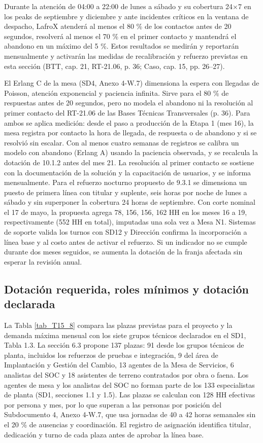 Durante la atención de 04:00 a 22:00 de lunes a sábado y su cobertura 24\ensuremath{\times}7 en los peaks de septiembre y diciembre y ante incidentes críticos en la ventana de despacho, LafroX atenderá al menos el 80 \% de los contactos antes de 20 segundos, resolverá al menos el 70 \% en el primer contacto y mantendrá el abandono en un máximo del 5 \%. Estos resultados se medirán y reportarán mensualmente y activarán las medidas de recalibración y refuerzo previstas en esta sección (BTT, cap. 21, RT-21.06, p. 36; Caso, cap. 15, pp. 26--27).

El Erlang C de la mesa (SD4, Anexo 4-W.7) dimensiona la espera con llegadas de Poisson, atención exponencial y paciencia infinita. Sirve para el 80 \% de respuestas antes de 20 segundos, pero no modela el abandono ni la resolución al primer contacto del RT-21.06 de las Bases Técnicas Transversales (p. 36). Para ambos se aplica medición: desde el paso a producción de la Etapa 1 (mes 16), la mesa registra por contacto la hora de llegada, de respuesta o de abandono y si se resolvió sin escalar. Con al menos cuatro semanas de registros se calibra un modelo con abandono (Erlang A) usando la paciencia observada, y se recalcula la dotación de 10.1.2 antes del mes 21. La resolución al primer contacto se sostiene con la documentación de la solución y la capacitación de usuarios, y se informa mensualmente. Para el refuerzo nocturno propuesto de 9.3.1 se dimensiona un puesto de primera línea con titular y suplente, seis horas por noche de lunes a sábado y sin superponer la cobertura 24 horas de septiembre. Con corte nominal el 17 de mayo, la propuesta agrega 78, 156, 156, 162 HH en los meses 16 a 19, respectivamente (552 HH en total), imputadas una sola vez a Mesa N1. Sistemas de soporte valida los turnos con SD12 y Dirección confirma la incorporación a línea base y al costo antes de activar el refuerzo. Si un indicador no se cumple durante dos meses seguidos, se aumenta la dotación de la franja afectada sin esperar la revisión anual.

\subsection{Dotación requerida, roles mínimos y dotación declarada}

La Tabla \ref{tab_T15_8} compara las plazas previstas para el proyecto y la demanda máxima mensual con los siete grupos técnicos declarados en el SD1, Tabla 1.3. La sección 6.3 propone 137 plazas: 91 desde los grupos técnicos de planta, incluidos los refuerzos de pruebas e integración, 9 del área de Implantación y Gestión del Cambio, 13 agentes de la Mesa de Servicios, 6 analistas del SOC y 18 asistentes de terreno contratados por obra o faena. Los agentes de mesa y los analistas del SOC no forman parte de los 133 especialistas de planta (SD1, secciones 1.1 y 1.5). Las plazas se calculan con 128 HH efectivas por persona y mes, por lo que superan a las personas por posición del Subdocumento 4, Anexo 4-W.7, que usa jornadas de 40 a 42 horas semanales sin el 20 \% de ausencias y coordinación. El registro de asignación identifica titular, dedicación y turno de cada plaza antes de aprobar la línea base.

